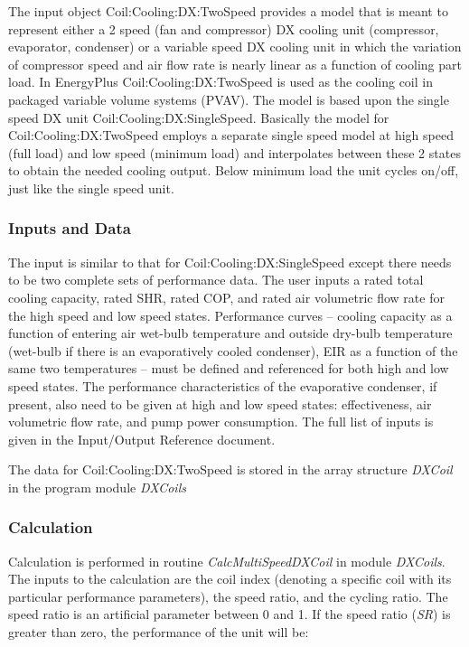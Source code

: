 The input object Coil:Cooling:DX:TwoSpeed provides a model that is meant to represent either a 2 speed (fan and compressor) DX cooling unit (compressor, evaporator, condenser) or a variable speed DX cooling unit in which the variation of compressor speed and air flow rate is nearly linear as a function of cooling part load. In EnergyPlus Coil:Cooling:DX:TwoSpeed is used as the cooling coil in packaged variable volume systems (PVAV). The model is based upon the single speed DX unit Coil:Cooling:DX:SingleSpeed. Basically the model for Coil:Cooling:DX:TwoSpeed employs a separate single speed model at high speed (full load) and low speed (minimum load) and interpolates between these 2 states to obtain the needed cooling output. Below minimum load the unit cycles on/off, just like the single speed unit.

\subsubsection{Inputs and Data}\label{inputs-and-data-001}

The input is similar to that for Coil:Cooling:DX:SingleSpeed except there needs to be two complete sets of performance data. The user inputs a rated total cooling capacity, rated SHR, rated COP, and rated air volumetric flow rate for the high speed and low speed states. Performance curves -- cooling capacity as a function of entering air wet-bulb temperature and outside dry-bulb temperature (wet-bulb if there is an evaporatively cooled condenser), EIR as a function of the same two temperatures -- must be defined and referenced for both high and low speed states. The performance characteristics of the evaporative condenser, if present, also need to be given at high and low speed states: effectiveness, air volumetric flow rate, and pump power consumption. The full list of inputs is given in the Input/Output Reference document.

The data for Coil:Cooling:DX:TwoSpeed is stored in the array structure \emph{DXCoil} in the program module \emph{DXCoils}

\subsubsection{Calculation}\label{calculation-000}

Calculation is performed in routine \emph{CalcMultiSpeedDXCoil} in module \emph{DXCoils}. The inputs to the calculation are the coil index (denoting a specific coil with its particular performance parameters), the speed ratio, and the cycling ratio. The speed ratio is an artificial parameter between 0 and 1. If the speed ratio (\emph{SR}) is greater than zero, the performance of the unit will be:

